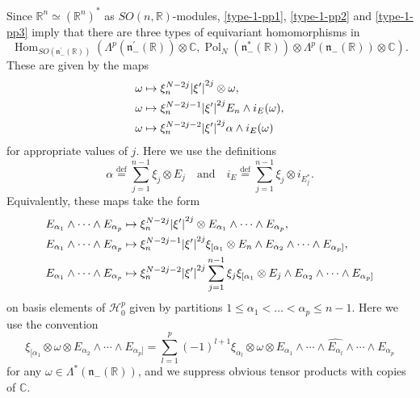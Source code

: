 \documentclass[a4paper,12pt,reqno]{amsart}
\numberwithin{theorem}{subsection}
\numberwithin{equation}{section}
\begin{document}
Since ${\mathbb{R}}^n \simeq ({\mathbb{R}}^n)^*$ as $SO(n,{\mathbb{R}})$-modules, \eqref{type-1-pp1},
\eqref{type-1-pp2} and \eqref{type-1-pp3} imply that there are three types of
equivariant homomorphisms in
\begin{equation*}\label{first-type}
   {\operatorname{Hom}}_{SO({{\mathfrak n}}_-^\prime({\mathbb{R}}))}(\Lambda^{p}({{\mathfrak n}}_-^\prime({\mathbb{R}})) \otimes {\mathbb{C}},
   {\operatorname{Pol}}_N({{\mathfrak n}}_-^*({\mathbb{R}})) \otimes \Lambda^p({{\mathfrak n}}_-({\mathbb{R}})) \otimes {\mathbb{C}}).
\end{equation*}
These are given by the maps
\begin{align}\label{type-1-N-gen}
   \omega & \mapsto \xi_n^{N-2j} {\lvert{\xi'}\rvert}^{2j} \otimes \omega, \notag \\
   \omega & \mapsto \xi_n^{N-2j-1} {\lvert{\xi'}\rvert}^{2j} E_n \wedge i_E (\omega), \notag \\
   \omega & \mapsto \xi_n^{N-2j-2} {\lvert{\xi'}\rvert}^{2j} \alpha \wedge i_E (\omega)
\end{align}
for appropriate values of $j$. Here we use the definitions
$$
   \alpha {\stackrel{\text{def}}{=}} \sum_{j=1}^{n-1} \xi_j \otimes E_j \quad \mbox{and} \quad
   i_E {\stackrel{\text{def}}{=}} \sum_{j=1}^{n-1} \xi_j \otimes i_{E_j^*}.
$$
Equivalently, these maps take the form
\begin{align}\label{type-1-N}
   E_{\alpha_1} \wedge \dots \wedge E_{\alpha_p} & \mapsto \xi_n^{N-2j} {\lvert{\xi'}\rvert}^{2j}
   \otimes E_{\alpha_1} \wedge \dots \wedge E_{\alpha_p}, \notag \\
   E_{\alpha_1}\wedge \dots \wedge E_{\alpha_p} & \mapsto \xi_n^{N-2j-1} {\lvert{\xi'}\rvert}^{2j}
   \xi_{[\alpha_1} \otimes E_n \wedge E_{\alpha_2}\wedge \cdots \wedge E_{\alpha_p]}, \notag \\
   E_{\alpha_1}\wedge \dots \wedge E_{\alpha_p} & \mapsto \xi_n^{N-2j-2} {\lvert{\xi'}\rvert}^{2j}
   \sum_{j=1}^{n-1} \xi_j \xi_{[\alpha_1} \otimes E_j \wedge E_{\alpha_2}\wedge \cdots \wedge
   E_{\alpha_p]}
\end{align}
on basis elements of ${\mathcal H}_0^p$ given by partitions $1\leq \alpha_1 < \dots
<\alpha_{p} \leq n-1$. Here we use the convention
\begin{equation}\label{anti}
   \xi_{[\alpha_1} \otimes \omega \otimes E_{\alpha_2} \wedge \cdots \wedge
   E_{\alpha_p]} = \sum_{l=1}^{p} (-1)^{l+1} \xi_{\alpha_l} \otimes \omega \otimes E_{\alpha_1}\wedge
   \cdots \wedge \widehat{E_{\alpha_l}} \wedge \cdots \wedge E_{\alpha_p}
\end{equation}
for any $\omega \in \Lambda^*({{\mathfrak n}}_-({\mathbb{R}}))$, and we suppress obvious tensor
products with copies of ${\mathbb{C}}$.
\end{document}
